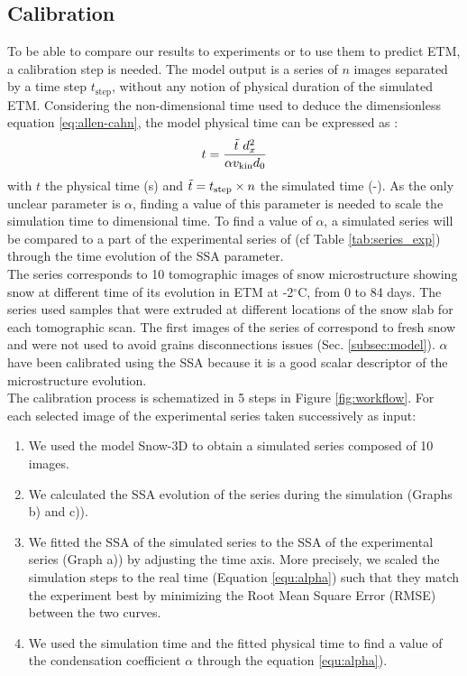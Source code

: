 \documentclass[draft,ms]{agujournal2019}
\begin{document}
\subsection{Calibration} 
\label{subsec:calib}
To be able to compare our results to experiments or to use them to predict ETM, a calibration step is needed. The model output is a series of $n$ images separated by a time step $t_{\mathrm{step}}$, without any notion of physical duration of the simulated ETM.
Considering the non-dimensional time used to deduce the dimensionless equation \eqref{eq:allen-cahn}, the model physical time can be expressed as \cite{bretin_and_denis_discrete-continuous_2015}: 
\begin{equation}\label{equ:alpha}
   t = \frac{\Tilde{t}\ d_x^2}{\alpha v_{\mathrm{kin}} d_0}
\end{equation}
with $t$ the physical time (s) and $\Tilde{t} = t_{\mathrm{step}} \times n$ the simulated time (-). As the only unclear parameter is $\alpha$, finding a value of this parameter is needed to scale the simulation time to dimensional time. To find a value of $\alpha$, a simulated series will be compared to a part of the experimental series of  (cf Table \ref{tab:series_exp}) through the time evolution of the SSA parameter.\\
The series corresponds to 10 tomographic images of snow microstructure showing snow at different time of its evolution in ETM at -2$^\circ$C, from 0 to 84 days. The series used samples that were extruded at different locations of the snow slab for each tomographic scan. The first images of the series of  correspond to fresh snow and were not used to avoid grains disconnections issues (Sec. \ref{subsec:model}). $\alpha$ have been calibrated using the SSA because it is a good scalar descriptor of the microstructure evolution.\\
The calibration process is schematized in 5 steps in Figure \ref{fig:workflow}. For each selected image of the experimental series taken successively as input: \\
\begin{enumerate}
    \item We used the model Snow-3D to obtain a simulated series composed of 10 images. 
    \item We calculated the SSA evolution of the series during the simulation (Graphs b) and c)).
    \item We fitted the SSA of the simulated series to the SSA of the experimental series (Graph a)) by adjusting the time axis. More precisely, we scaled the simulation steps to the real time (Equation \eqref{equ:alpha}) such that they match the experiment best by minimizing the Root Mean Square Error (RMSE) between the two curves.   
    \item We used the simulation time and the fitted physical time to find a value of the condensation coefficient $\alpha$ through the equation \eqref{equ:alpha}). 
\end{enumerate}
\end{document}
